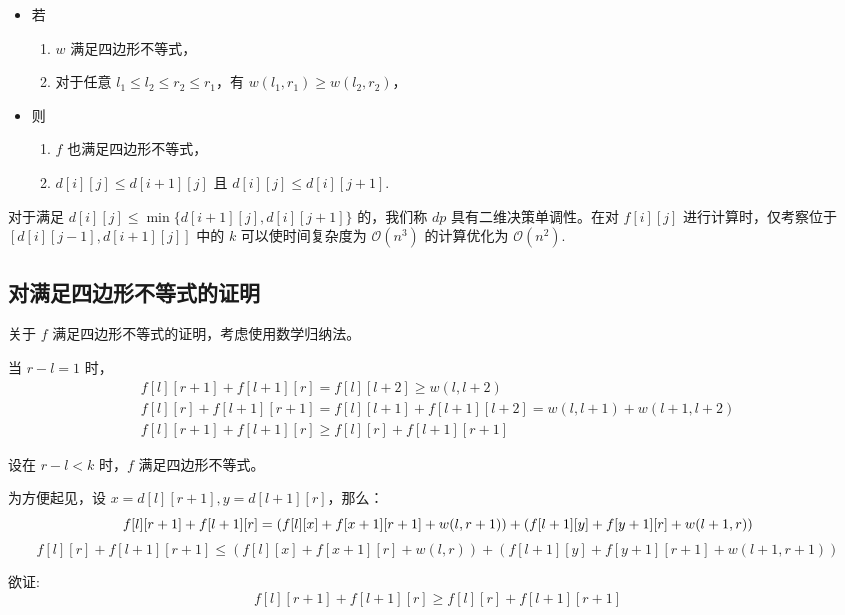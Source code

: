 \begin{itemize}

\item
  若

  \begin{enumerate}
  \def\labelenumi{\arabic{enumi}.}

  \item
    \(w\) 满足四边形不等式，
  \item
    对于任意 \(l_1\le l_2\le r_2\le r_1\)，有
    \(w(l_1,r_1)\ge w(l_2,r_2)\)，
  \end{enumerate}
\item
  则

  \begin{enumerate}
  \def\labelenumi{\arabic{enumi}.}

  \item
    \(f\) 也满足四边形不等式，
  \item
    \(d[i][j]\le d[i+1][j]\) 且 \(d[i][j]\le d[i][j+1]\).
  \end{enumerate}
\end{itemize}

对于满足 \(d[i][j]\le \min\{d[i+1][j],d[i][j+1]\}\) 的，我们称 \(dp\)
具有二维决策单调性。在对 \(f[i][j]\) 进行计算时，仅考察位于
\([d[i][j-1],d[i+1][j]]\) 中的 \(k\) 可以使时间复杂度为
\(\mathcal{O}(n^3)\) 的计算优化为 \(\mathcal{O}(n^2)\).

\subsection{对满足四边形不等式的证明}

关于 \(f\) 满足四边形不等式的证明，考虑使用数学归纳法。

当 \(r-l=1\) 时， \[
\begin{array}{c}
f[l][r+1]+f[l+1][r]=f[l][l+2]\ge w(l,l+2)\\
f[l][r]+f[l+1][r+1]=f[l][l+1]+f[l+1][l+2]=w(l,l+1)+w(l+1,l+2)\\
f[l][r+1]+f[l+1][r]\ge f[l][r]+f[l+1][r+1]
\end{array}
\]

设在 \(r-l < k\) 时，\(f\) 满足四边形不等式。

为方便起见，设 \(x=d[l][r+1],y=d[l+1][r]\)，那么： \[
f[l][r+1]+f[l+1][r]=(f[l][x]+f[x+1][r+1]+w(l,r+1))+(f[l+1][y]+f[y+1][r]+w(l+1,r))\\
\]
\[f[l][r]+f[l+1][r+1]\le(f[l][x]+f[x+1][r]+w(l,r))+(f[l+1][y]+f[y+1][r+1]+w(l+1,r+1))
\]

欲证: \[f[l][r+1]+f[l+1][r]\ge f[l][r]+f[l+1][r+1]
\]

